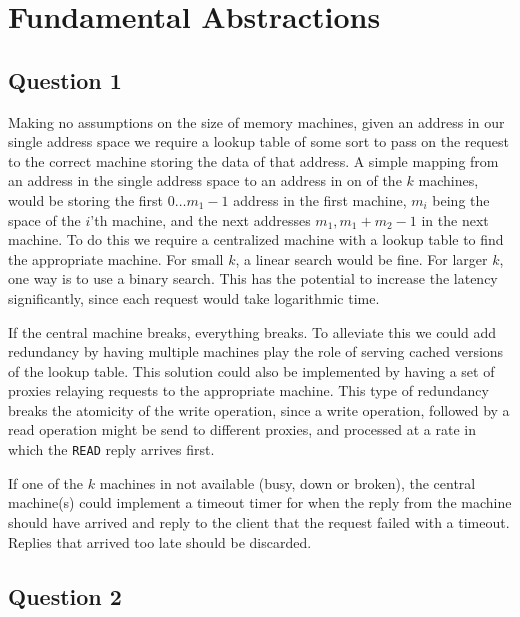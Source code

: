 
\section{Fundamental Abstractions}

\subsection{Question 1}

Making no assumptions on the size of memory machines, given an address in our single address space we require a lookup table of some sort to pass on the request to the correct machine storing the data of that address. A simple mapping from an address in the single address space to an address in on of the $k$ machines, would be storing the first $0 \dots m_1-1$ address in the first machine, $m_i$ being the space of the $i$'th machine, and the next addresses $m_1, m_1+m_2-1$ in the next machine. To do this we require a centralized machine with a lookup table to find the appropriate machine. For small $k$, a linear search would be fine. For larger $k$, one way is to use a binary search. This has the potential to increase the latency significantly, since each request would take logarithmic time.

If the central machine breaks, everything breaks. To alleviate this we could add redundancy by having multiple machines play the role of serving cached versions of the lookup table. This solution could also be implemented by having a set of proxies relaying requests to the appropriate machine. This type of redundancy breaks the atomicity of the write operation, since a write operation, followed by a read operation might be send to different proxies, and processed at a rate in which the {\tt READ} reply arrives first.

If one of the $k$ machines in not available (busy, down or broken), the central machine(s) could implement a timeout timer for when the reply from the machine should have arrived and reply to the client that the request failed with a timeout. Replies that arrived too late should be discarded.

\subsection{Question 2}

